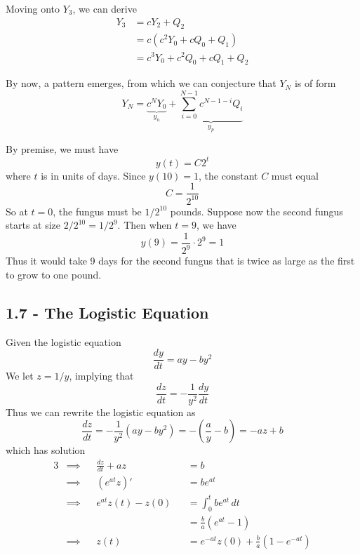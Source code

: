 \documentclass[a4paper]{article}
\begin{document}
Moving onto \(Y_{3}\), we can derive
\begin{align*}
	Y_{3} & = cY_{2} + Q_{2} \\
	 & = c \!\left( c^{2}Y_{0} + cQ_{0} + Q_{1} \right)  \\ 
	 & = c^{3}Y_{0} + c^{2}Q_{0} + cQ_{1} + Q_{2}
\end{align*}

By now, a pattern emerges, from which we can conjecture that \(Y_{N}\) is of form
\[
	Y_{N} = \underbrace{c^{N} Y_{0}}_{y_{n}} + \underbrace{\sum_{i=0}^{N-1} c^{N - 1 - i}Q_{i}}_{y_{p}}
\]


By premise, we must have
\[
	y \!\left( t \right) = C2^{t}
\]
where \(t\) is in units of days. Since \(y \!\left( 10 \right) = 1\), the constant \(C\) must equal
\[
	C = \frac{1}{2^{10}}
\]
So at \(t = 0\), the fungus must be \(1 / 2^{10}\) pounds. Suppose now the second fungus starts at size \(2 / 2^{10} = 1 / 2^{9}\). Then when \(t = 9\), we have
\[
	y \!\left( 9 \right) = \frac{1}{2^{9}} \cdot 2^{9} = 1
\]
Thus it would take 9 days for the second fungus that is twice as large as the first to grow to one pound.

\newpage
\subsection{\textsf{1.7 - The Logistic Equation}}

Given the logistic equation
\[
	\frac{d y}{d t} = ay - by^{2}
\]
We let \(z = 1/y\), implying that
\[
	\frac{d z}{d t} = -\frac{1}{y^{2}} \frac{d y}{d t} 
\]
Thus we can rewrite the logistic equation as
\[
	\frac{d z}{d t} = -\frac{1}{y^{2}} \!\left( ay - by^{2} \right) = - \!\left( \frac{a}{y} - b \right) = -az + b
\]
which has solution
\begin{alignat*}{3}
	&\implies && \frac{d z}{d t}  + az && = b \\
	&\implies && \!\left( e^{at}z \right)' && = b e^{at} \\ 
	&\implies && e^{at} z \!\left( t \right) - z \!\left( 0 \right) && = \int^{t}_{0} be^{at} \, dt \\
	& && && = \frac{b}{a} \!\left( e^{at} - 1 \right)  \\
	&\implies && z \!\left( t \right) && = e^{-at} z \!\left( 0 \right) + \frac{b}{a} \!\left( 1 - e^{-at} \right) 
\end{alignat*}
\end{document}
